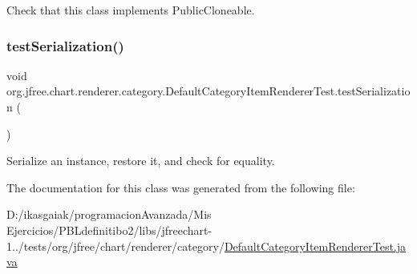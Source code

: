Check that this class implements Public\+Cloneable. \mbox{\label{classorg_1_1jfree_1_1chart_1_1renderer_1_1category_1_1_default_category_item_renderer_test_afa12874cb027aa8632dc9d7b8a9303d2}} 
\subsubsection{\texorpdfstring{test\+Serialization()}{testSerialization()}}
{\footnotesize\ttfamily void org.\+jfree.\+chart.\+renderer.\+category.\+Default\+Category\+Item\+Renderer\+Test.\+test\+Serialization (\begin{DoxyParamCaption}{ }\end{DoxyParamCaption})}

Serialize an instance, restore it, and check for equality. 

The documentation for this class was generated from the following file\+:\begin{DoxyCompactItemize}
\item 
D\+:/ikasgaiak/programacion\+Avanzada/\+Mis Ejercicios/\+P\+B\+Ldefinitibo2/libs/jfreechart-\/1../tests/org/jfree/chart/renderer/category/\mbox{\hyperlink{_default_category_item_renderer_test_8java}{Default\+Category\+Item\+Renderer\+Test.\+java}}\end{DoxyCompactItemize}
